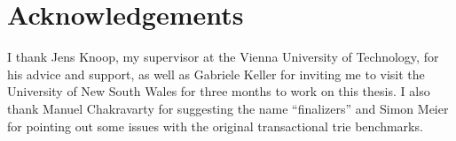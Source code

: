 \chapter{Acknowledgements}

I thank Jens Knoop, my supervisor at the Vienna University of Technology, for his advice and support, as well as Gabriele Keller for inviting me to visit the University of New South Wales for three months to work on this thesis. I also thank Manuel Chakravarty for suggesting the name ``finalizers'' and Simon Meier for pointing out some issues with the original transactional trie benchmarks.
